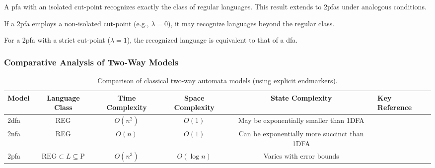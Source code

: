 \begin{theorem}
\label{thm:2pfa-rabin}
A \gls{pfa} with an isolated cut-point recognizes exactly the class of regular languages. This result extends to \glspl{2pfa} under analogous conditions.
\end{theorem}

\begin{proposition}
If a \gls{2pfa} employs a non-isolated cut-point (e.g., \(\lambda = 0\)), it may recognize languages beyond the regular class.
\end{proposition}

\begin{corollary}
For a \gls{2pfa} with a strict cut-point (\(\lambda = 1\)), the recognized language is equivalent to that of a \gls{dfa}.
\end{corollary}


\subsubsection{Comparative Analysis of Two-Way Models}
\label{subsubsec:two-way-comparison}

\begin{table}[h]
    \centering
    \begin{adjustbox}{max width=\textwidth}
    \begin{tabular}{|l|c|c|c|c|l|}
        \hline
        \textbf{Model} & \textbf{Language Class} & \textbf{Time Complexity} & \textbf{Space Complexity} & \textbf{State Complexity} & \textbf{Key Reference} \\
        \hline
        \gls{2dfa}  & REG & \(O(n^2)\) & \(O(1)\) & May be exponentially smaller than 1DFA & \cite{hopcroft2006introduction} \\
        \gls{2nfa}  & REG & \(O(n)\) & \(O(1)\) & Can be exponentially more succinct than 1DFA & \cite{yakaryilmaz2010succinctness} \\
        \gls{2pfa}  & \( \mbox{REG} \subset L \subseteq \mbox{P} \) & \(O(n^3)\) & \(O(\log n)\) & Varies with error bounds & \cite{freivalds1981probabilistic} \\
        \hline
    \end{tabular}
    \end{adjustbox}
    \caption{Comparison of classical two-way automata models (using explicit endmarkers).}
    \label{tab:two-way-comparison}
\end{table}

